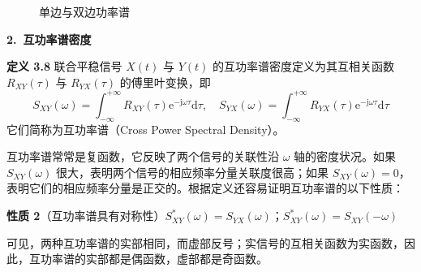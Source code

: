 \documentclass[11pt,openany,UTF8]{ctexbook}
\newcommand{\dif}{\mathrm{d}}                      %
\newcommand{\eu}{\mathrm{e}}                       %
\newcommand{\ju}{\mathrm{j}}                       %
\newcommand{\bhead}[1]{\par\medskip\noindent\textbf{#1}\par\smallskip}
\newcommand{\thm}[1]{\par\medskip\noindent\textbf{#1}\quad}
\newcommand{\fw}[1]{{\xeCJKsetup{CJKecglue={}}（#1\nobreak）}}
\begin{document}
\begin{figure}[htbp]
\centering
{}
\caption{单边与双边功率谱}\label{fig:3.8}
\end{figure}

\bhead{2.\ 互功率谱密度}

\thm{定义 3.8} 联合平稳信号 $X(t)$ 与 $Y(t)$ 的互功率谱密度定义为其互相关函数 $R_{XY}(\tau)$ 与 $R_{YX}(\tau)$ 的傅里叶变换\nobreak，即
\begin{equation}
S_{XY}(\omega)=\int_{-\infty}^{+\infty}R_{XY}(\tau)\eu^{-\ju\omega\tau}\dif\tau,\quad
S_{YX}(\omega)=\int_{-\infty}^{+\infty}R_{YX}(\tau)\eu^{-\ju\omega\tau}\dif\tau
\label{eq:3.23}
\end{equation}
它们简称为互功率谱\fw{Cross Power Spectral Density}\nobreak。

互功率谱常常是复函数\nobreak，它反映了两个信号的关联性沿 $\omega$ 轴的密度状况\nobreak。如果 $S_{XY}(\omega)$ 很大\nobreak，表明两个信号的相应频率分量关联度很高\nobreak；如果 $S_{XY}(\omega)=0$\nobreak，表明它们的相应频率分量是正交的\nobreak。根据定义还容易证明互功率谱的以下性质\nobreak：

\thm{性质 2}（互功率谱具有对称性\nobreak）$S_{XY}^{*}(\omega)=S_{YX}(\omega)$\nobreak；$S_{XY}^{*}(\omega)=S_{XY}(-\omega)$

可见\nobreak，两种互功率谱的实部相同\nobreak，而虚部反号\nobreak；实信号的互相关函数为实函数\nobreak，因此\nobreak，互功率谱的实部都是偶函数\nobreak，虚部都是奇函数\nobreak。
\end{document}
